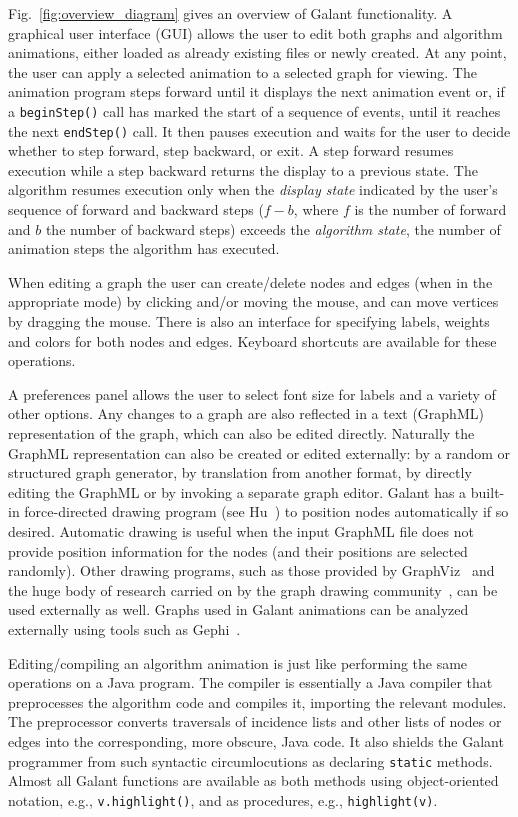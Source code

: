 Fig.~\ref{fig:overview_diagram} gives an overview of Galant functionality.
A graphical user interface (GUI) allows the user to edit both graphs and
algorithm animations, either loaded as already existing files or newly
created. At any point, the user can apply a selected animation to a selected
graph for viewing.
The animation program 
steps forward until it
displays the next animation event or, if a \texttt{beginStep()}
call has marked the start of a sequence of events, until
it reaches the next \texttt{endStep()} call.
It then pauses execution and waits for the user to decide whether to
step forward, step backward, or exit.
A step forward resumes execution while a step backward returns the display to a previous
state.
The algorithm resumes execution only when the \emph{display state}
indicated by the user's sequence of forward and backward steps
($f-b$, where $f$ is the number of forward and $b$ the number of backward steps)
exceeds the \emph{algorithm state}, the number of animation steps the algorithm
has executed.

When editing a graph the user can create/delete nodes and edges (when in the appropriate mode)
by clicking and/or
moving the mouse, and can move vertices by dragging the mouse.
There is also an interface for specifying labels, weights and colors for both
nodes and edges.
Keyboard shortcuts are available for these operations.
 
A preferences panel allows the user to select font size for labels and a
variety of other options.
Any changes to a graph are also reflected in a text (GraphML) representation
of the graph, which can also be edited directly. Naturally the GraphML
representation can also be created or edited externally: by a random or
structured graph generator, by translation from another format, by directly
editing the GraphML or by invoking a separate graph editor.
Galant has a built-in force-directed drawing program 
(see Hu~\cite{2006-Mathematica-Hu}) to position nodes
automatically if so desired.
Automatic drawing is useful when the input GraphML file does not provide position
information for the nodes (and their positions are selected randomly).
Other drawing programs, such as those provided by GraphViz~\cite{GraphViz}
and the huge body of research carried on by the graph drawing community~\cite{graph_drawing},
can be used externally as well.
Graphs used in Galant animations
can be analyzed externally using tools such as Gephi~\cite{gephi}.

Editing/compiling an algorithm animation is just like performing the same
operations on a Java program.
The compiler is essentially a Java
compiler that preprocesses the algorithm code
and compiles it, importing the relevant modules.
The preprocessor converts traversals of incidence lists and other
lists of nodes or edges into the corresponding, more obscure, Java code.
It also shields the Galant programmer from such syntactic circumlocutions
as declaring \texttt{static} methods.
Almost all Galant functions are available as both methods
using object-oriented notation, e.g., \texttt{v.highlight()},
and as procedures, e.g., \texttt{highlight(v)}.

